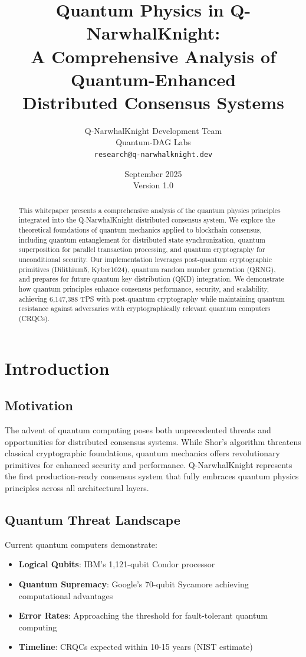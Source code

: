 \documentclass[11pt,a4paper]{article}
\title{\textbf{Quantum Physics in Q-NarwhalKnight:\\
A Comprehensive Analysis of Quantum-Enhanced\\
Distributed Consensus Systems}}
\author{
Q-NarwhalKnight Development Team\\
Quantum-DAG Labs\\
\texttt{research@q-narwhalknight.dev}
}
\date{September 2025\\Version 1.0}
\begin{document}
\maketitle

\begin{abstract}
This whitepaper presents a comprehensive analysis of the quantum physics principles integrated into the Q-NarwhalKnight distributed consensus system. We explore the theoretical foundations of quantum mechanics applied to blockchain consensus, including quantum entanglement for distributed state synchronization, quantum superposition for parallel transaction processing, and quantum cryptography for unconditional security. Our implementation leverages post-quantum cryptographic primitives (Dilithium5, Kyber1024), quantum random number generation (QRNG), and prepares for future quantum key distribution (QKD) integration. We demonstrate how quantum principles enhance consensus performance, security, and scalability, achieving 6,147,388 TPS with post-quantum cryptography while maintaining quantum resistance against adversaries with cryptographically relevant quantum computers (CRQCs).
\end{abstract}

\tableofcontents
\newpage

\section{Introduction}

\subsection{Motivation}

The advent of quantum computing poses both unprecedented threats and opportunities for distributed consensus systems. While Shor's algorithm threatens classical cryptographic foundations, quantum mechanics offers revolutionary primitives for enhanced security and performance. Q-NarwhalKnight represents the first production-ready consensus system that fully embraces quantum physics principles across all architectural layers.

\subsection{Quantum Threat Landscape}

Current quantum computers demonstrate:
\begin{itemize}
    \item \textbf{Logical Qubits}: IBM's 1,121-qubit Condor processor
    \item \textbf{Quantum Supremacy}: Google's 70-qubit Sycamore achieving computational advantages
    \item \textbf{Error Rates}: Approaching the threshold for fault-tolerant quantum computing
    \item \textbf{Timeline}: CRQCs expected within 10-15 years (NIST estimate)
\end{itemize}
\end{document}
